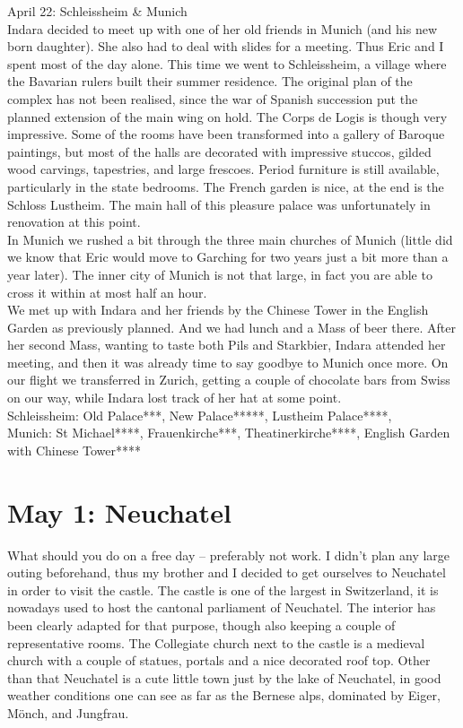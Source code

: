 April 22: Schleissheim \& Munich\\
Indara decided to meet up with one of her old friends in Munich (and his new born daughter). She also had to deal with slides for a meeting. Thus Eric and I spent most of the day alone. This time we went to Schleissheim, a village where the Bavarian rulers built their summer residence. The original plan of the complex has not been realised, since the war of Spanish succession put the planned extension of the main wing on hold. The Corps de Logis is though very impressive. Some of the rooms have been transformed into a gallery of Baroque paintings, but most of the halls are decorated with impressive stuccos, gilded wood carvings, tapestries, and large frescoes. Period furniture is still available, particularly in the state bedrooms. The French garden is nice, at the end is the Schloss Lustheim. The main hall of this pleasure palace was unfortunately in renovation at this point.\\
In Munich we rushed a bit through the three main churches of Munich (little did we know that Eric would move to Garching for two years just a bit more than a year later). The inner city of Munich is not that large, in fact you are able to cross it within at most half an hour.\\ 
We met up with Indara and her friends by the Chinese Tower in the English Garden as previously planned. And we had lunch and a Mass of beer there. After her second Mass, wanting to taste both Pils and Starkbier, Indara attended her meeting, and then it was already time to say goodbye to Munich once more. On our flight we transferred in Zurich, getting a couple of chocolate bars from Swiss on our way, while Indara lost track of her hat at some point.\\

Schleissheim: Old Palace***, New Palace*****, Lustheim Palace****, \\
Munich: St Michael****, Frauenkirche***, Theatinerkirche****, English Garden with Chinese Tower****

\section{May 1: Neuchatel}
\label{Neuchatel2014}

What should you do on a free day -- preferably not work. I didn't plan any large outing beforehand, thus my brother and I decided to get ourselves to Neuchatel in order to visit the castle. The castle is one of the largest in Switzerland, it is nowadays used to host the cantonal parliament of Neuchatel. The interior has been clearly adapted for that purpose, though also keeping a couple of representative rooms. The Collegiate church next to the castle is a medieval church with a couple of statues, portals and a nice decorated roof top. Other than that Neuchatel is a cute little town just by the lake of Neuchatel, in good weather conditions one can see as far as the Bernese alps, dominated by Eiger, M\"onch, and Jungfrau.\\

